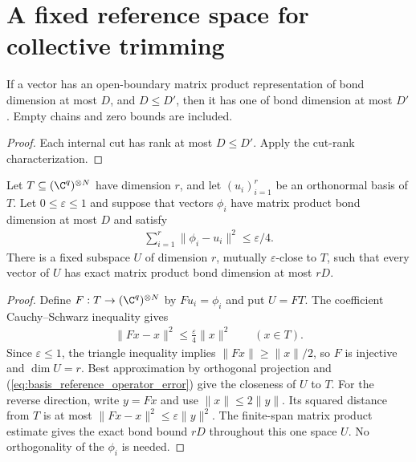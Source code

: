 \section{A fixed reference space for collective trimming}

\begin{lemma}
    \label{thm:open_mps_bond_mono}
    \leanok
    If a vector has an open-boundary matrix product representation of bond
    dimension at most $D$, and $D\le D'$, then it has one of bond dimension
    at most $D'$. Empty chains and zero bounds are included.
\end{lemma}
\begin{proof}
    \leanok
    Each internal cut has rank at most $D\le D'$. Apply the cut-rank
    characterization.
\end{proof}


\begin{lemma}
    \label{thm:mps_basis_reference_subspace}
    \leanok
    Let $T\subseteq(\C^q)^{\otimes N}$ have dimension $r$, and let
    $(u_i)_{i=1}^r$ be an orthonormal basis of $T$.
    Let $0\le\varepsilon\le1$ and suppose that vectors $\phi_i$ have matrix
    product bond dimension at most $D$ and satisfy
    \begin{align}
        \sum_{i=1}^r\|\phi_i-u_i\|^2\le\varepsilon/4.
        \label{eq:basis_reference_total_error}
    \end{align}
    There is a fixed subspace $U$ of dimension $r$, mutually
    $\varepsilon$-close to $T$, such that every vector of $U$ has exact
    matrix product bond dimension at most $rD$.
\end{lemma}
\begin{proof}
    \leanok
    Define $F:T\to(\C^q)^{\otimes N}$ by $Fu_i=\phi_i$ and put $U=FT$.
    The coefficient Cauchy--Schwarz inequality gives
    \begin{align}
        \|Fx-x\|^2\le\frac{\varepsilon}{4}\|x\|^2\qquad(x\in T).
        \label{eq:basis_reference_operator_error}
    \end{align}
    Since $\varepsilon\le1$, the triangle inequality implies
    $\|Fx\|\ge\|x\|/2$, so $F$ is injective and $\dim U=r$.
    Best approximation by orthogonal projection and
    (\ref{eq:basis_reference_operator_error}) give the closeness of $U$ to $T$.
    For the reverse direction, write $y=Fx$ and use
    $\|x\|\le2\|y\|$. Its squared distance from $T$ is at most
    $\|Fx-x\|^2\le\varepsilon\|y\|^2$.
    The finite-span matrix product estimate gives the exact bond bound $rD$
    throughout this one space $U$. No orthogonality of the $\phi_i$ is needed.
\end{proof}

